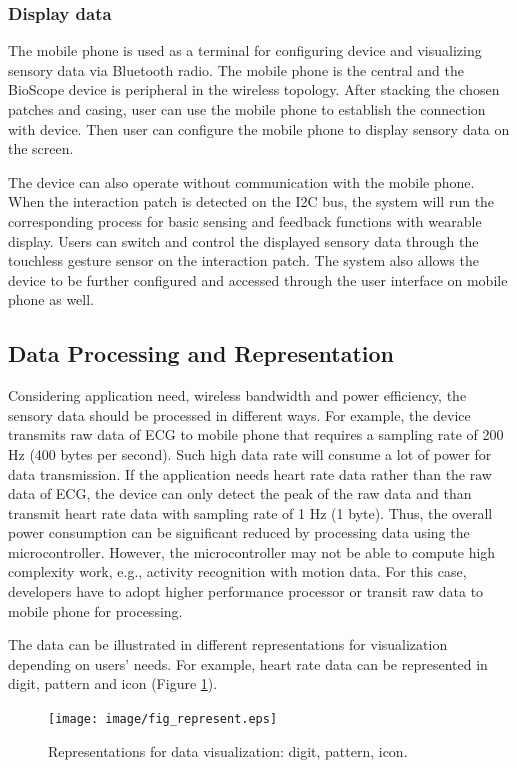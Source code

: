 \subsubsection{Display data}
The mobile phone is used as a terminal for configuring device and visualizing sensory data via Bluetooth radio.
The mobile phone is the central and the BioScope device is peripheral in the wireless topology.
After stacking the chosen patches and casing, user can use the mobile phone to establish the connection with device.
Then user can configure the mobile phone to display sensory data on the screen.

The device can also operate without communication with the mobile phone.
When the interaction patch is detected on the I2C bus, the system will run the corresponding process for basic sensing and feedback functions with wearable display.
Users can switch and control the displayed sensory data through the touchless gesture sensor on the interaction patch.
The system also allows the device to be further configured and accessed through the user interface on mobile phone as well.


\subsection{Data Processing and Representation}
Considering application need, wireless bandwidth and power efficiency, the sensory data should be processed in different ways.
For example, the device transmits raw data of ECG to mobile phone that requires a sampling rate of 200 Hz (400 bytes per second). 
Such high data rate will consume a lot of power for data transmission.
If the application needs heart rate data rather than the raw data of ECG, the device can only detect the peak of the raw data and than transmit heart rate data with sampling rate of 1 Hz (1 byte).
Thus, the overall power consumption can be significant reduced by processing data using the microcontroller.
However, the microcontroller may not be able to compute high complexity work, e.g., activity recognition with motion data.
For this case, developers have to adopt higher performance processor or transit raw data to mobile phone for processing.

The data can be illustrated in different representations for visualization depending on users' needs.
For example, heart rate data can be represented in digit, pattern and icon (Figure \ref{fig_represent}).

\begin{figure}[ht]
\centering
\texttt{[image: image/fig\_represent.eps]}
\caption{Representations for data visualization: digit, pattern, icon.}
\label{fig_represent}
\end{figure}

